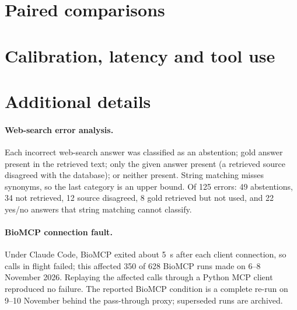 \documentclass[11pt]{article}
\begin{document}
\section{Paired comparisons}
\label{app:paired}



\section{Calibration, latency and tool use}
\label{app:calib}

\begin{table}[h]
\centering\footnotesize
\setlength{\tabcolsep}{2.5pt}
\caption{Base tier, Sonnet/Haiku, RareMCP 0.1.0. ECE: expected calibration error over 10 equal-width bins of stated confidence. Latency: median wall-clock seconds per run. Tool calls: mean per run.}
\label{tab:calib}
\end{table}

\section{Additional details}
\label{app:details}

\paragraph{Web-search error analysis.} Each incorrect web-search answer was classified as an abstention; gold answer present in the retrieved text; only the given answer present (a retrieved source disagreed with the database); or neither present. String matching misses synonyms, so the last category is an upper bound. Of 125 errors: 49 abstentions, 34 not retrieved, 12 source disagreed, 8 gold retrieved but not used, and 22 yes/no answers that string matching cannot classify.

\paragraph{BioMCP connection fault.} Under Claude Code, BioMCP exited about 5~s after each client connection, so calls in flight failed; this affected 350 of 628 BioMCP runs made on 6--8 November 2026. Replaying the affected calls through a Python MCP client reproduced no failure. The reported BioMCP condition is a complete re-run on 9--10 November behind the pass-through proxy; superseded runs are archived.
\end{document}

